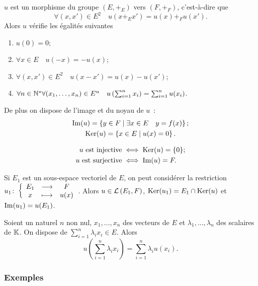 \begin{prop}
  \(u\) est un morphisme du groupe \((E,+_E)\) vers \((F,+_F)\), c'est-à-dire 
  que
  \begin{equation}
    \forall (x,x') \in E^2 \quad u(x+_E x')=u(x)+_F u(x').
  \end{equation}
  Alors \(u\) vérifie les égalités suivantes
  \begin{enumerate}
    \item \(u(0)=0\);
    \item \(\forall x \in E \quad u(-x)=-u(x)\);
    \item \(\forall (x,x') \in E^2 \quad u(x-x')=u(x)-u(x')\);
    \item \(\forall n \in \mathbb{N}^* \forall (x_1, \ldots, x_n) \in E^n \quad 
      u\left(\sum_{i=1}^n x_i \right) = \sum_{i=1}^n u(x_i)\).
  \end{enumerate}
  De plus on dispose de l'image et du noyau de \(u\)~:
  \begin{gather}
    \operatorname{Im}(u) = \left\{y \in  F\mathrel{}\middle|\mathrel{}\exists x \in E \quad y=f(x)\right\};\\
    \operatorname{Ker}(u)=\left\{x \in E\mathrel{}\middle|\mathrel{}u(x)=0\right\}.
  \end{gather}
\end{prop}
%
\begin{prop}
  \begin{align}
    u \text{~est injective} &\iff \operatorname{Ker}(u)=\{0\}; \\
    u \text{~est surjective} &\iff \operatorname{Im}(u)=F.
  \end{align}
\end{prop}
Si \(E_1\) est un sous-espace vectoriel de \(E\), on peut considérer la 
restriction \(u_1\colon\left\{\begin{array}{ccc}E_1 & \longrightarrow &F\\x & \longmapsto & u(x)\end{array}\right.\). Alors \(u \in \mathcal{L}\left(E_1,F\right)\), 
\(\operatorname{Ker}(u_1)=E_1 \cap \operatorname{Ker}(u)\) et \(\operatorname{Im}(u_1)=u(E_1)\).
\begin{prop}
  Soient un naturel \(n\) non nul, \(x_1, \ldots, x_n\) des vecteurs de \(E\) et 
  \(\lambda_1, \ldots, \lambda_n\) des scalaires de \(\mathbb{K}\). On dispose de 
  \(\sum_{i=1}^n \lambda_i x_i \in E\). Alors
  \begin{equation}
    u\left(\sum_{i=1}^n \lambda_i x_i \right)= \sum_{i=1}^n \lambda_i u(x_i).
  \end{equation}
\end{prop}

\subsubsection{Exemples}

